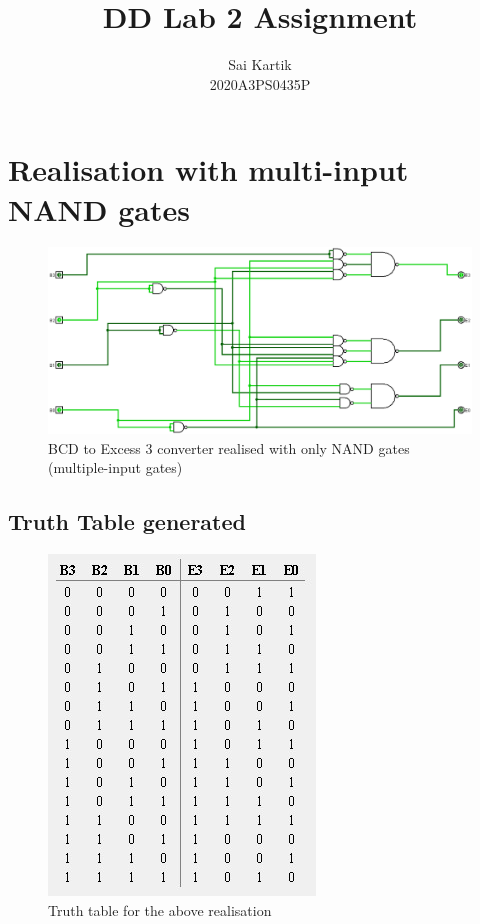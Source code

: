 \documentclass[12pt]{article}
\title{DD Lab 2 Assignment}
\author{Sai Kartik \\2020A3PS0435P}
\begin{document}
\maketitle
\section{Realisation with multi-input NAND gates}
\begin{center}
    \begin{figure}[ht]
        \includegraphics[scale=0.30]{onlynands.png}
        \caption{BCD to Excess 3 converter realised with only NAND gates (multiple-input gates)}
    \end{figure}
\end{center}
\newpage
\subsection{Truth Table generated}
\begin{center}
    \begin{figure}[ht]
        \includegraphics{ttonlynands.jpg}
        \caption{Truth table for the above realisation}
    \end{figure}
\end{center}
\end{document}
